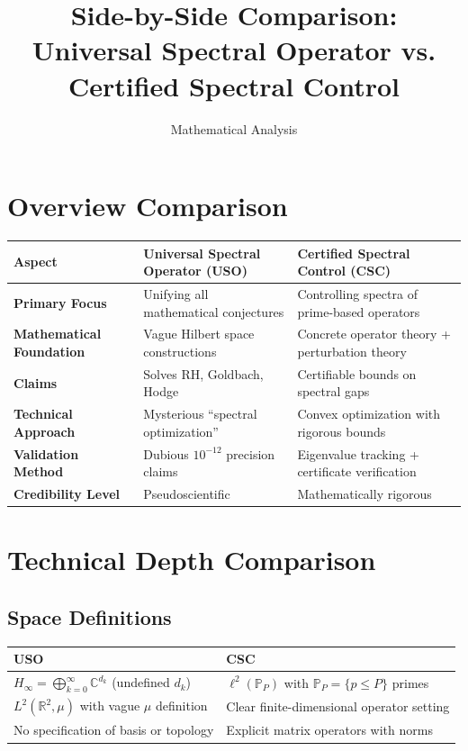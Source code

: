 \documentclass[10pt]{article}
\title{Side-by-Side Comparison: Universal Spectral Operator vs. Certified Spectral Control}
\author{Mathematical Analysis}
\date{}
\begin{document}
\maketitle

\section*{Overview Comparison}

\begin{table}[h!]
\centering
\begin{tabular}{L{4cm}C{5cm}C{5cm}}
\toprule
\textbf{Aspect} & \textbf{Universal Spectral Operator (USO)} & \textbf{Certified Spectral Control (CSC)} \\
\midrule
\textbf{Primary Focus} & Unifying all mathematical conjectures & Controlling spectra of prime-based operators \\
\textbf{Mathematical Foundation} & Vague Hilbert space constructions & Concrete operator theory + perturbation theory \\
\textbf{Claims} & Solves RH, Goldbach, Hodge & Certifiable bounds on spectral gaps \\
\textbf{Technical Approach} & Mysterious ``spectral optimization'' & Convex optimization with rigorous bounds \\
\textbf{Validation Method} & Dubious $10^{-12}$ precision claims & Eigenvalue tracking + certificate verification \\
\textbf{Credibility Level} & \textcolor{redflag}{Pseudoscientific} & \textcolor{greenflag}{Mathematically rigorous} \\
\bottomrule
\end{tabular}
\end{table}

\section*{Technical Depth Comparison}

\subsection*{Space Definitions}

\begin{table}[h!]
\centering
\begin{tabular}{L{6cm}L{6cm}}
\toprule
\textcolor{usored}{\textbf{USO}} & \textcolor{cscgreen}{\textbf{CSC}} \\
\midrule
$H_{\infty} = \bigoplus_{k=0}^{\infty} \mathbb{C}^{d_k}$ (undefined $d_k$) & $\ell^2(\mathbb{P}_P)$ with $\mathbb{P}_P = \{p \leq P\}$ primes \\
$L^2(\mathbb{R}^2, \mu)$ with vague $\mu$ definition & Clear finite-dimensional operator setting \\
No specification of basis or topology & Explicit matrix operators with norms \\
\bottomrule
\end{tabular}
\end{table}
\end{document}
